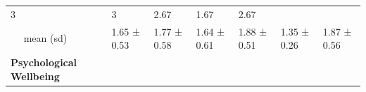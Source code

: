 \documentclass[
  english,
  man,floatsintext]{apa6}
\begin{document}
\begin{longtable}[]{@{}lllllll@{}}
\begin{minipage}[t]{0.11\columnwidth}
3\strut
\end{minipage} & \begin{minipage}[t]{0.11\columnwidth}\raggedright
3\strut
\end{minipage} & \begin{minipage}[t]{0.11\columnwidth}\raggedright
2.67\strut
\end{minipage} & \begin{minipage}[t]{0.11\columnwidth}\raggedright
1.67\strut
\end{minipage} & \begin{minipage}[t]{0.11\columnwidth}\raggedright
2.67\strut
\end{minipage}\tabularnewline
\begin{minipage}[t]{0.16\columnwidth}\raggedright
~~ mean (sd)\strut
\end{minipage} & \begin{minipage}[t]{0.11\columnwidth}\raggedright
1.65 ± 0.53\strut
\end{minipage} & \begin{minipage}[t]{0.11\columnwidth}\raggedright
1.77 ± 0.58\strut
\end{minipage} & \begin{minipage}[t]{0.11\columnwidth}\raggedright
1.64 ± 0.61\strut
\end{minipage} & \begin{minipage}[t]{0.11\columnwidth}\raggedright
1.88 ± 0.51\strut
\end{minipage} & \begin{minipage}[t]{0.11\columnwidth}\raggedright
1.35 ± 0.26\strut
\end{minipage} & \begin{minipage}[t]{0.11\columnwidth}\raggedright
1.87 ± 0.56\strut
\end{minipage}\tabularnewline
\begin{minipage}[t]{0.16\columnwidth}\raggedright
\textbf{Psychological Wellbeing}\strut
\end{minipage} & \begin{minipage}[t]{0.11\columnwidth}\raggedright
~~\strut
\end{minipage} & \begin{minipage}[t]{0.11\columnwidth}\raggedright
~~\strut
\end{minipage} & \begin{minipage}[t]{0.11\columnwidth}\raggedright
~~\strut
\end{minipage} & \begin{minipage}[t]{0.11\columnwidth}\raggedright

\end{minipage}
\end{longtable}
\end{document}
